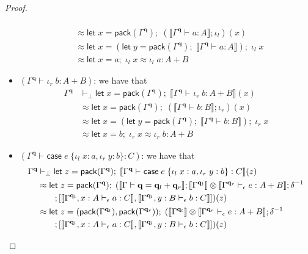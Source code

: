 \documentclass[acmsmall,screen,review]{acmart}
\newcommand{\mb}[1]{\ensuremath{\mathbf{#1}}}
\newcommand{\ms}[1]{\ensuremath{\mathsf{#1}}}
\newcommand{\lto}{:}
\newcommand{\linl}[1]{\iota_l\;{#1}}
\newcommand{\linr}[1]{\iota_r\;{#1}}
\newcommand{\letexpr}[3]{\ensuremath{\ms{let}\;#1 = #2;\;#3}}
\newcommand{\caseexpr}[5]{\ms{case}\;#1\;\{\linl{#2} \lto #3, \linr{#4} \lto #5\}}
\newcommand{\qsp}[4]{#1 \vdash #2 = #3 + #4}
\newcommand{\hasty}[4]{#1 \vdash_{#2} #3: {#4}}
\newcommand{\dnt}[1]{\llbracket{#1}\rrbracket}
\begin{document}
\begin{proof}
\begin{itemize}
\begin{align*}
      \\ &\approx 
      \letexpr{x}{\ms{pack}(\Gamma^{\mb{q}})}
        {(\dnt{\hasty{\Gamma^{\mb{q}}}{}{a}{A}} ; \iota_l)(x)}
      \\ &\approx
      \letexpr{x}{(\letexpr{y}{\ms{pack}(\Gamma^{\mb{q}})}{\dnt{\hasty{\Gamma^{\mb{q}}}{}{a}{A}}})}
        {\linl{x}} 
      \\ &\approx
      \letexpr{x}{a}{\linl{x}} \approx \linl{a} : A + B
    \end{align*}
    \item $(\hasty{\Gamma^{\mb{q}}}{}{\linr{b}}{A + B})$: we have that
    \begin{align*}
    \Gamma^{\mb{q}} &\vdash_\bot
      \letexpr{x}{\ms{pack}(\Gamma^{\mb{q}})}{\dnt{\hasty{\Gamma^{\mb{q}}}{}{\linr{b}}{A + B}}(x)}
      \\ &\approx 
      \letexpr{x}{\ms{pack}(\Gamma^{\mb{q}})}
        {(\dnt{\hasty{\Gamma^{\mb{q}}}{}{b}{B}} ; \iota_r)(x)}
      \\ &\approx
      \letexpr{x}{(\letexpr{y}{\ms{pack}(\Gamma^{\mb{q}})}{\dnt{\hasty{\Gamma^{\mb{q}}}{}{b}{B}}})}
        {\linr{x}} 
      \\ &\approx
      \letexpr{x}{b}{\linr{x}} \approx \linr{b} : A + B
    \end{align*}
    \item $(\hasty{\Gamma^{\mb{q}}}{}{\caseexpr{e}{x}{a}{y}{b}}{C})$: we have that
    \begin{align*}
    \Gamma^{\mb{q}} &\vdash_\bot
      \letexpr{z}{\ms{pack}(\Gamma^{\mb{q}})}
        {\dnt{\hasty{\Gamma^{\mb{q}}}{}{\caseexpr{e}{x}{a}{y}{b}}{C}}(z)}
      \\ &\approx 
      \letexpr{z}{\ms{pack}(\Gamma^{\mb{q}})}{(\dnt{\qsp{\Gamma}{\mb{q}}{\mb{q}_l}{\mb{q}_r}}
        ; \dnt{\Gamma^{\mb{q}_l}} \otimes \dnt{\hasty{\Gamma^{\mb{q}_r}}{\epsilon}{e}{A + B}}
        ; \delta^{-1} \\ & \qquad
        ; [
          \dnt{\hasty{\Gamma^{\mb{q}_l}, x : A}{\epsilon}{a}{C}},
          \dnt{\hasty{\Gamma^{\mb{q}_l}, y : B}{\epsilon}{b}{C}}
        ])(z)}
      \\ &\approx
      \letexpr{z}{(\ms{pack}(\Gamma^{\mb{q}_l}), \ms{pack}(\Gamma^{\mb{q}_r}))}{(
        \dnt{\Gamma^{\mb{q}_l}} \otimes \dnt{\hasty{\Gamma^{\mb{q}_r}}{\epsilon}{e}{A + B}}
        ; \delta^{-1} \\ & \qquad
        ; [
          \dnt{\hasty{\Gamma^{\mb{q}_l}, x : A}{\epsilon}{a}{C}},
          \dnt{\hasty{\Gamma^{\mb{q}_l}, y : B}{\epsilon}{b}{C}}
        ])(z)}

\end{align*}
\end{itemize}
\end{proof}
\end{document}
